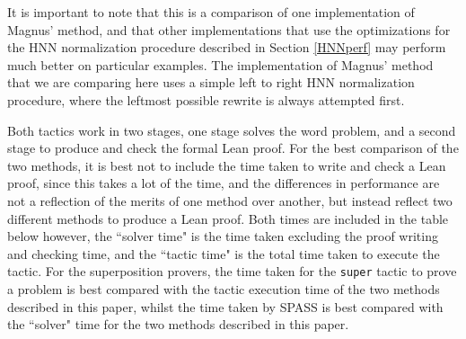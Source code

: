 \documentclass[12pt]{article} %
\theoremstyle{definition}
\theoremstyle{definition}
\theoremstyle{definition}
\theoremstyle{definition}
\theoremstyle{definition}
\theoremstyle{definition}
\begin{document}
It is important to note that this is a comparison of one implementation
of Magnus' method, and that other implementations that use the optimizations for the HNN
normalization procedure described in Section \ref{HNNperf} may perform much better on
particular examples. The implementation of Magnus' method that
we are comparing here uses a simple left to right HNN normalization
procedure, where the leftmost possible rewrite is always attempted first.

Both tactics work in two stages, one stage solves the word problem, and a second stage
to produce and check the formal Lean proof. For the best comparison of the two
methods, it is best not to include the time taken to write and check a Lean proof,
since this takes a lot of the time, and the differences in performance are not a reflection
of the merits of one method over another, but instead reflect two different methods
to produce a Lean proof. Both times are included in the table below however, the ``solver
time" is the time taken excluding the proof writing and checking time, and
the ``tactic time" is the total time taken to execute the tactic. For the superposition
provers, the time taken for the \lstinline{super} tactic to prove a problem is best compared
with the tactic execution time of the two methods described in this paper, whilst
the time taken by SPASS is best compared with the ``solver" time for the two methods described in
this paper.
\end{document}
